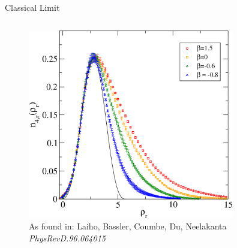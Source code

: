 \begin{frame}{Classical Limit}
\begin{columns}
\begin{column}{0.48\textwidth}
{\begin{figure}
    \includegraphics[width=0.8\textwidth]{pics/deSitter}
    \caption{\tiny{As found in: Laiho, Bassler, Coumbe, Du, Neelakanta \emph{PhysRevD.96.064015}}}
   \end{figure}}
  \end{column}
 \end{columns}
\end{frame}

